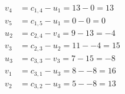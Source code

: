 \[
\begin{aligned}
v_{4} &= c_{1,4} - u_{1} = 13 - 0 = 13 \\
v_{5} &= c_{1,5} - u_{1} = 0 - 0 = 0 \\
u_{2} &= c_{2,4} - v_{4} = 9 - 13 = -4 \\
v_{3} &= c_{2,3} - u_{2} = 11 - -4 = 15 \\
u_{3} &= c_{3,3} - v_{3} = 7 - 15 = -8 \\
v_{1} &= c_{3,1} - u_{3} = 8 - -8 = 16 \\
v_{2} &= c_{3,2} - u_{3} = 5 - -8 = 13 \\
\end{aligned}
\]

